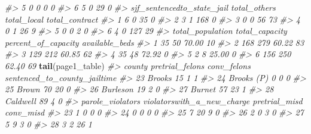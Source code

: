 \documentclass[
  12pt,
]{book}
\newenvironment{Shaded}{\begin{snugshade}}{\end{snugshade}}
\newcommand{\CommentTok}[1]{\textcolor[rgb]{0.56,0.35,0.01}{\textit{#1}}}
\newcommand{\KeywordTok}[1]{\textcolor[rgb]{0.13,0.29,0.53}{\textbf{#1}}}
\newcommand{\NormalTok}[1]{#1}
\begin{document}
\begin{Shaded}
\begin{Highlighting}[]
\CommentTok{\#> 5              0       0            0                        0}
\CommentTok{\#> 6              5       0           29                        0}
\CommentTok{\#>   sjf\_sentencedto\_state\_jail total\_others total\_local total\_contract}
\CommentTok{\#> 1                          6            0          35              0}
\CommentTok{\#> 2                          3            1         168              0}
\CommentTok{\#> 3                          0            0          56             73}
\CommentTok{\#> 4                          0            1          26              9}
\CommentTok{\#> 5                          0            0           2              0}
\CommentTok{\#> 6                          4            0         127             29}
\CommentTok{\#>   total\_population total\_capacity percent\_of\_capacity available\_beds}
\CommentTok{\#> 1               35             50               70.00             10}
\CommentTok{\#> 2              168            279               60.22             83}
\CommentTok{\#> 3              129            212               60.85             62}
\CommentTok{\#> 4               35             48               72.92              0}
\CommentTok{\#> 5                2              8               25.00              0}
\CommentTok{\#> 6              156            250               62.40             69}
\KeywordTok{tail}\NormalTok{(page1\_table)}
\CommentTok{\#>        county pretrial\_felons conv\_felons sentenced\_to\_county\_jailtime}
\CommentTok{\#> 23     Brooks              15           1                            1}
\CommentTok{\#> 24 Brooks (P)               0           0                            0}
\CommentTok{\#> 25      Brown              70          20                            0}
\CommentTok{\#> 26   Burleson              19           2                            0}
\CommentTok{\#> 27     Burnet              57          23                            1}
\CommentTok{\#> 28   Caldwell              89           4                            0}
\CommentTok{\#>    parole\_violators violatorswith\_a\_new\_charge pretrial\_misd conv\_misd}
\CommentTok{\#> 23                1                          0             0         0}
\CommentTok{\#> 24                0                          0             0         0}
\CommentTok{\#> 25                7                         20             9         0}
\CommentTok{\#> 26                2                          0             3         0}
\CommentTok{\#> 27                5                          9             3         0}
\CommentTok{\#> 28                3                          2            26         1}

\end{Highlighting}
\end{Shaded}
\end{document}
